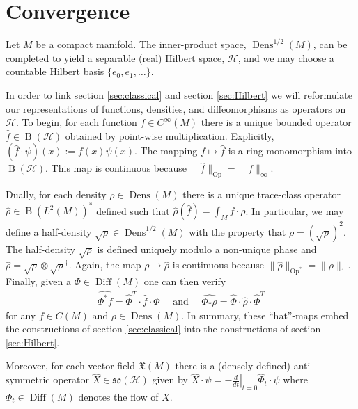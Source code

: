 \documentclass[12pt]{amsart}
\renewcommand{\H}{\ensuremath{\mathcal{H}}}
\DeclareMathOperator{\Diff}{Diff}
\DeclareMathOperator{\Dens}{Dens}
\DeclareMathOperator{\B}{B}
\DeclareMathOperator{\Op}{Op}
\begin{document}
\section{Convergence}
\label{sec:convergence}
Let $M$ be a compact manifold.
The inner-product space, $\Dens^{1/2}(M)$, can be completed to yield a separable (real) Hilbert space, $\H$,
and we may choose a countable Hilbert basis $\{e_0,e_1,\dots\}$.

In order to link section \ref{sec:classical} and section \ref{sec:Hilbert}
we will reformulate our representations of functions, densities, and diffeomorphisms as operators on $\H$.
To begin, for each function $f \in C^\infty(M)$ there is a unique bounded operator $\hat{f} \in \B( \H )$
obtained by point-wise multiplication.  Explicitly, $(\hat{f} \cdot \psi)(x) := f(x) \psi(x)$.
The mapping $f \mapsto \hat{f}$ is a ring-monomorphism into $\B(\H)$.
This map is continuous because $\| \hat{f} \|_{\Op} = \| f \|_{\infty}$.

Dually, for each density $\rho \in \Dens(M)$ there is a unique trace-class operator $\hat{\rho} \in \B(L^2(M))^*$ defined
such that $ \hat{\rho} (\hat{f}) = \int_M f \cdot \rho $.
In particular, we may define a half-density $\sqrt{\rho} \in \Dens^{1/2}(M)$ with the property that $\rho = (\sqrt{\rho})^{2}$.
The half-density $\sqrt{\rho}$ is defined uniquely modulo a non-unique phase and $\hat{\rho} = \sqrt{\rho} \otimes \sqrt{\rho}^\dagger$.
Again, the map $\rho \mapsto \hat{\rho}$ is continuous because $\| \hat{\rho} \|_{\Op^*} = \| \rho \|_{1}$.
Finally, given a $\Phi \in \Diff(M)$ one can then verify
\begin{align*}
	\widehat{\Phi^* f} = \widehat{\Phi}^T \cdot \hat{f} \cdot \widehat{\Phi} \quad \text{ and } \quad
	\widehat{\Phi_* \rho} = \widehat{\Phi} \cdot \hat{\rho} \cdot \widehat{\Phi}^T
\end{align*}
for any $f \in C(M)$ and $\rho \in \Dens(M)$.
In summary, these ``hat''-maps embed the constructions of section \ref{sec:classical} into the constructions of section \ref{sec:Hilbert}.



Moreover, for each vector-field $\mathfrak{X}(M)$ there is a (densely defined) anti-symmetric operator $\widehat{X} \in \mathfrak{so}(\H)$
given by $\widehat{X} \cdot \psi =  - \left. \frac{d}{dt} \right|_{t=0} \widehat{\Phi}_t \cdot \psi$
where $\Phi_t \in \Diff(M)$ denotes the flow of $X$.
\end{document}

